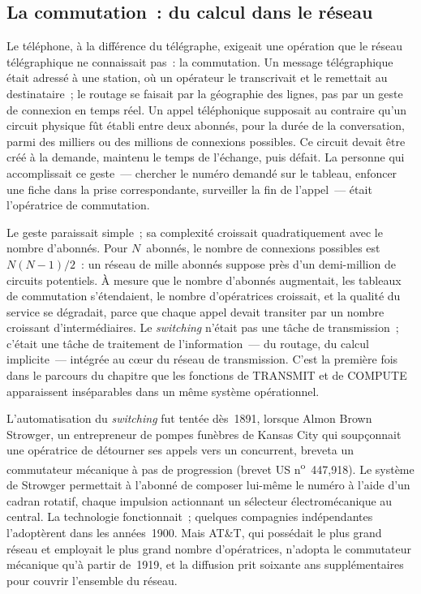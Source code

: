 \subsection{La commutation~: du calcul dans le réseau}\label{subsec:commutation}

Le téléphone, à la différence du télégraphe, exigeait une opération que le réseau télégraphique ne connaissait pas~: la commutation. Un message télégraphique était adressé à une station, où un opérateur le transcrivait et le remettait au destinataire~; le routage se faisait par la géographie des lignes, pas par un geste de connexion en temps réel. Un appel téléphonique supposait au contraire qu'un circuit physique fût établi entre deux abonnés, pour la durée de la conversation, parmi des milliers ou des millions de connexions possibles. Ce circuit devait être créé à la demande, maintenu le temps de l'échange, puis défait. La personne qui accomplissait ce geste~--- chercher le numéro demandé sur le tableau, enfoncer une fiche dans la prise correspondante, surveiller la fin de l'appel~--- était l'opératrice de commutation.

%
Le geste paraissait simple~; sa complexité croissait quadratiquement avec le nombre d'abonnés. Pour $N$~abonnés, le nombre de connexions possibles est $N(N-1)/2$~: un réseau de mille abonnés suppose près d'un demi-million de circuits potentiels. À mesure que le nombre d'abonnés augmentait, les tableaux de commutation s'étendaient, le nombre d'opératrices croissait, et la qualité du service se dégradait, parce que chaque appel devait transiter par un nombre croissant d'intermédiaires. Le \emph{switching} n'était pas une tâche de transmission~; c'était une tâche de traitement de l'information~--- du routage, du calcul implicite~--- intégrée au c\oe{}ur du réseau de transmission. C'est la première fois dans le parcours du chapitre que les fonctions de TRANSMIT et de COMPUTE apparaissent inséparables dans un même système opérationnel.

L'automatisation du \emph{switching} fut tentée dès~1891, lorsque Almon Brown Strowger, un entrepreneur de pompes funèbres de Kansas City qui soupçonnait une opératrice de détourner ses appels vers un concurrent, breveta un commutateur mécanique à pas de progression (brevet US n\textsuperscript{o}~447,918). Le système de Strowger permettait à l'abonné de composer lui-même le numéro à l'aide d'un cadran rotatif, chaque impulsion actionnant un sélecteur électromécanique au central. La technologie fonctionnait~; quelques compagnies indépendantes l'adoptèrent dans les années~1900. Mais AT\&T, qui possédait le plus grand réseau et employait le plus grand nombre d'opératrices, n'adopta le commutateur mécanique qu'à partir de~1919, et la diffusion prit soixante ans supplémentaires pour couvrir l'ensemble du réseau.


